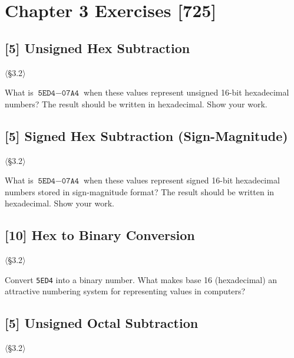 \newpage
\section{Chapter 3 Exercises [725]}

\subsection{[5] Unsigned Hex Subtraction}
\hypertarget{prob-3.1}{}
\noindent$\langle$\S3.2$\rangle$\medskip

\noindent What is $\texttt{5ED4} - \texttt{07A4}$ when these values represent
unsigned 16-bit hexadecimal numbers? The result should be written in
hexadecimal. Show your work.

\problembreak

\subsection{[5] Signed Hex Subtraction (Sign-Magnitude)}
\hypertarget{prob-3.2}{}
\noindent$\langle$\S3.2$\rangle$\medskip

\noindent What is $\texttt{5ED4} - \texttt{07A4}$ when these values represent
signed 16-bit hexadecimal numbers stored in sign-magnitude format? The result
should be written in hexadecimal. Show your work.

\problembreak

\subsection{[10] Hex to Binary Conversion}
\hypertarget{prob-3.3}{}
\noindent$\langle$\S3.2$\rangle$\medskip

\noindent Convert \texttt{5ED4} into a binary number. What makes base 16
(hexadecimal) an attractive numbering system for representing values in
computers?

\problembreak

\subsection{[5] Unsigned Octal Subtraction}
\hypertarget{prob-3.4}{}
\noindent$\langle$\S3.2$\rangle$\medskip

